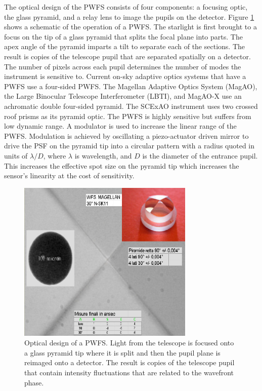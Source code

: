 The optical design of the PWFS consists of four components: a focusing optic, the glass pyramid, and a relay lens to image the pupils on the detector.\cite{ragazzoni2002pyramid} Figure \ref{fig:pyramid} shows a schematic of the operation of a PWFS.  The starlight is first brought to a focus on the tip of a glass pyramid that splits the focal plane into parts. The apex angle of the pyramid imparts a tilt to separate each of the sections. The result is copies of the telescope pupil that are separated spatially on a detector. The number of pixels across each pupil determines the number of modes the instrument is sensitive to. Current on-sky adaptive optics systems that have a PWFS use a four-sided PWFS. The Magellan Adaptive Optics System (MagAO)\cite{close2018status}, the Large Binocular Telescope Interferometer (LBTI)\cite{esposito2011adaptive}, and MagAO-X use an achromatic double four-sided pyramid. The SCExAO instrument uses two crossed roof prisms as its pyramid optic. The PWFS is highly sensitive but suffers from low dynamic range. A modulator is used to increase the linear range of the PWFS. Modulation is achieved by oscillating a piezo-actuator driven mirror to drive the PSF on the pyramid tip into a circular pattern with a radius quoted in units of $\lambda/D$, where $\lambda$ is wavelength, and $D$ is the diameter of the entrance pupil. This increases the effective spot size on the pyramid tip which increases the sensor's linearity at the cost of sensitivity.\cite{guyon2005}  

\begin{figure}
    \centering
    \includegraphics[width=0.75\textwidth]{Chapter Materials/Chapter Three Materials/pyramid.png}
    \caption{Optical design of a PWFS. Light from the telescope is focused onto a glass pyramid tip where it is split and then the pupil plane is reimaged onto a detector. The result is copies of the telescope pupil that contain intensity fluctuations that are related to the wavefront phase. \cite{pyramidfig}}
    \label{fig:pyramid}
\end{figure}


